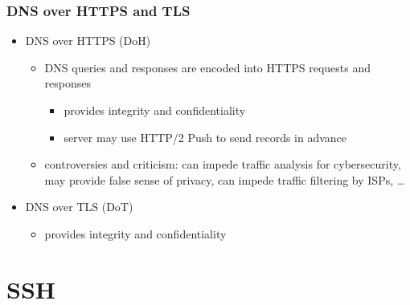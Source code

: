 \documentclass[final]{article}
\begin{document}
\subsubsection*{DNS over HTTPS and TLS}
\begin{itemize}[nosep]
    \item DNS over HTTPS (DoH)
          \begin{itemize}[nosep]
              \item DNS queries and responses are encoded into HTTPS requests and responses
                    \begin{itemize}[nosep]
                        \item provides integrity and confidentiality
                        \item server may use HTTP/2 Push to send records in advance
                    \end{itemize}
              \item controversies and criticism: can impede traffic analysis for cybersecurity, may provide false sense of privacy, can impede traffic filtering by ISPs, \dots
          \end{itemize}
    \item DNS over TLS (DoT)
          \begin{itemize}[nosep]
              \item provides integrity and confidentiality
          \end{itemize}
\end{itemize}
\section{SSH}
\end{document}
